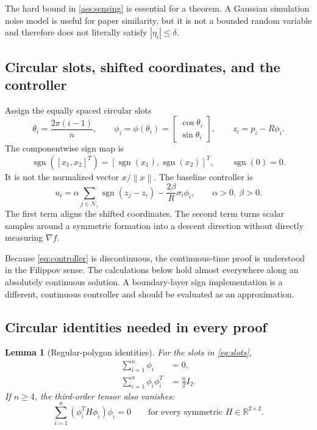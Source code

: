 \documentclass[11pt]{article}
\newtheorem{lemma}[theorem]{Lemma}
\newcommand{\R}{\mathbb{R}}
\newcommand{\N}{\mathcal{N}}
\newcommand{\sgn}{\operatorname{sgn}}
\newcommand{\norm}[1]{\left\lVert #1\right\rVert}
\begin{document}
The hard bound in \cref{ass:sensing} is essential for a theorem. A Gaussian simulation noise model is useful for paper similarity, but it is not a bounded random variable and therefore does not literally satisfy $|\eta_i|\leq\delta$.

\subsection{Circular slots, shifted coordinates, and the controller}

Assign the equally spaced circular slots
\begin{equation}\label{eq:slots}
    \theta_i=\frac{2\pi(i-1)}{n},\qquad
    \phi_i=\phi(\theta_i)=
    \begin{bmatrix}\cos\theta_i\\\sin\theta_i\end{bmatrix},\qquad
    z_i=p_i-R\phi_i.
\end{equation}
The componentwise sign map is
\begin{equation}\label{eq:component-sign}
    \sgn([x_1,x_2]^T)=[\sgn(x_1),\sgn(x_2)]^T,
    \qquad \sgn(0)=0.
\end{equation}
It is not the normalized vector $x/\norm{x}$. The baseline controller is
\begin{equation}\label{eq:controller}
    u_i=\alpha\sum_{j\in\N_i}\sgn(z_j-z_i)
       -\frac{2\beta}{R}\sigma_i\phi_i,
    \qquad \alpha>0,\ \beta>0.
\end{equation}
The first term aligns the shifted coordinates. The second term turns scalar samples around a symmetric formation into a descent direction without directly measuring $\nabla f$.

Because \eqref{eq:controller} is discontinuous, the continuous-time proof is understood in the Filippov sense. The calculations below hold almost everywhere along an absolutely continuous solution. A boundary-layer sign implementation is a different, continuous controller and should be evaluated as an approximation.

\subsection{Circular identities needed in every proof}\label{sec:circle-identities}

\begin{lemma}[Regular-polygon identities]\label{lem:circle-identities}
For the slots in \eqref{eq:slots},
\begin{align}
    \sum_{i=1}^n\phi_i&=0,\label{eq:sum-phi-zero}\\
    \sum_{i=1}^n\phi_i\phi_i^T&=\frac{n}{2}I_2.\label{eq:sum-outer-product}
\end{align}
If $n\geq4$, the third-order tensor also vanishes:
\begin{equation}\label{eq:third-moment}
    \sum_{i=1}^n (\phi_i^T H\phi_i)\phi_i=0
    \qquad \text{for every symmetric }H\in\R^{2\times2}.
\end{equation}
\end{lemma}
\end{document}
